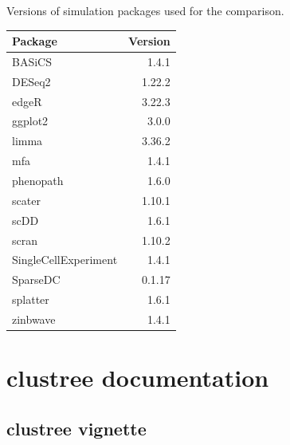 \documentclass[11pt,a4paper,titlepage,twoside,openright]{style/unimelbthesis}
\theoremstyle{definition}
\theoremstyle{definition}
\theoremstyle{definition}
\theoremstyle{remark}
\begin{document}
\begin{mainmatter}
Versions of simulation packages used for the comparison.

\begin{longtable}[]{@{}lr@{}}
\toprule
Package & Version\tabularnewline
\midrule
\endhead
BASiCS & 1.4.1\tabularnewline
DESeq2 & 1.22.2\tabularnewline
edgeR & 3.22.3\tabularnewline
ggplot2 & 3.0.0\tabularnewline
limma & 3.36.2\tabularnewline
mfa & 1.4.1\tabularnewline
phenopath & 1.6.0\tabularnewline
scater & 1.10.1\tabularnewline
scDD & 1.6.1\tabularnewline
scran & 1.10.2\tabularnewline
SingleCellExperiment & 1.4.1\tabularnewline
SparseDC & 0.1.17\tabularnewline
splatter & 1.6.1\tabularnewline
zinbwave & 1.4.1\tabularnewline
\bottomrule
\end{longtable}

\hypertarget{clustree-docs}{%
\chapter{clustree documentation}\label{clustree-docs}}

\hypertarget{clustree-vignette}{%
\section{clustree vignette}\label{clustree-vignette}}


\end{mainmatter}
\end{document}

